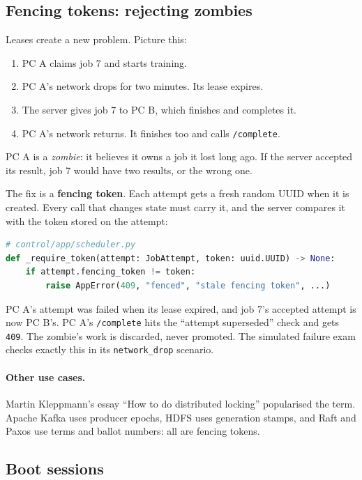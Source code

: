 \subsection{Fencing tokens: rejecting zombies}

Leases create a new problem. Picture this:

\begin{enumerate}
\item PC A claims job 7 and starts training.
\item PC A's network drops for two minutes. Its lease expires.
\item The server gives job 7 to PC B, which finishes and completes it.
\item PC A's network returns. It finishes too and calls \texttt{/complete}.
\end{enumerate}

PC A is a \emph{zombie}: it believes it owns a job it lost long ago. If the
server accepted its result, job 7 would have two results, or the wrong one.

The fix is a \textbf{fencing token}. Each attempt gets a fresh random UUID when
it is created. Every call that changes state must carry it, and the server
compares it with the token stored on the attempt:

\begin{lstlisting}[language=Python]
# control/app/scheduler.py
def _require_token(attempt: JobAttempt, token: uuid.UUID) -> None:
    if attempt.fencing_token != token:
        raise AppError(409, "fenced", "stale fencing token", ...)
\end{lstlisting}

PC A's attempt was failed when its lease expired, and job 7's accepted attempt
is now PC B's. PC A's \texttt{/complete} hits the ``attempt superseded'' check
and gets \texttt{409}. The zombie's work is discarded, never promoted. The
simulated failure exam checks exactly this in its \texttt{network\_drop}
scenario.

\paragraph{Other use cases.} Martin Kleppmann's essay ``How to do distributed
locking'' popularised the term. Apache Kafka uses producer epochs, HDFS uses
generation stamps, and Raft and Paxos use terms and ballot numbers: all are
fencing tokens.

\subsection{Boot sessions}

